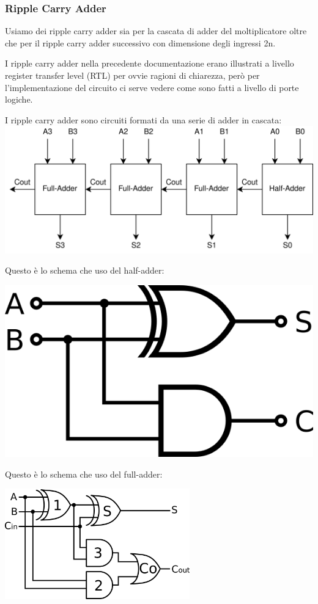 \documentclass[12pt, letterpaper]{article}
\begin{document}
\subsubsection{Ripple Carry Adder}

Usiamo dei ripple carry adder sia per la cascata di adder del moltiplicatore oltre che per il ripple carry adder successivo con dimensione degli ingressi 2n.

I ripple carry adder nella precedente documentazione erano illustrati a livello register transfer level (RTL) per ovvie ragioni di chiarezza, però per l'implementazione del circuito ci serve vedere come sono fatti a livello di porte logiche.  

I ripple carry adder sono circuiti formati da una serie di adder in cascata:
\includegraphics[width=\textwidth]{ripple_carry_adder}

Questo è lo schema che uso del half-adder:
\begin{center}
\includegraphics{half_adder}
\end{center}

Questo è lo schema che uso del full-adder:
\begin{center}
\includegraphics[width=8cm]{full_adder}
\end{center}
\end{document}
